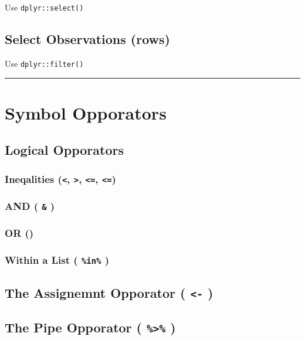 \documentclass[]{book}
\begin{document}
Use \texttt{dplyr::select()}

\subsection{Select Observations (rows)}\label{select-observations-rows}

Use \texttt{dplyr::filter()}

\begin{center}\rule{0.5\linewidth}{\linethickness}\end{center}

\section{Symbol Opporators}\label{symbol-opporators}

\subsection{Logical Opporators}\label{logical-opporators}

\subsubsection{\texorpdfstring{Ineqalities (\texttt{\textless{}},
\texttt{\textgreater{}}, \texttt{\textless{}=},
\texttt{\textless{}=})}{Ineqalities (\textless{}, \textgreater{}, \textless{}=, \textless{}=)}}\label{ineqalities}

\subsubsection{\texorpdfstring{AND ( \texttt{\&}
)}{AND ( \& )}}\label{and}

\subsubsection{\texorpdfstring{OR
(\texttt{\textbar{}})}{OR (\textbar{})}}\label{or}

\subsubsection{\texorpdfstring{Within a List ( \texttt{\%in\%}
)}{Within a List ( \%in\% )}}\label{within-a-list-in}

\subsection{\texorpdfstring{The Assignemnt Opporator (
\texttt{\textless{}-}
)}{The Assignemnt Opporator ( \textless{}- )}}\label{the-assignemnt-opporator--}

\subsection{\texorpdfstring{The Pipe Opporator (
\texttt{\%\textgreater{}\%}
)}{The Pipe Opporator ( \%\textgreater{}\% )}}\label{the-pipe-opporator}


\end{document}
